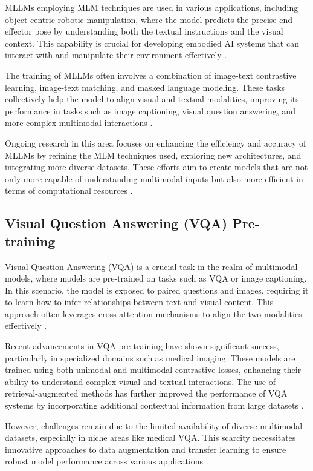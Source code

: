 MLLMs employing MLM techniques are used in various applications, including object-centric robotic manipulation, where the model predicts the precise end-effector pose by understanding both the textual instructions and the visual context. This capability is crucial for developing embodied AI systems that can interact with and manipulate their environment effectively \cite{ManipLLM2024}.

The training of MLLMs often involves a combination of image-text contrastive learning, image-text matching, and masked language modeling. These tasks collectively help the model to align visual and textual modalities, improving its performance in tasks such as image captioning, visual question answering, and more complex multimodal interactions \cite{OverviewLMM2024}.

Ongoing research in this area focuses on enhancing the efficiency and accuracy of MLLMs by refining the MLM techniques used, exploring new architectures, and integrating more diverse datasets. These efforts aim to create models that are not only more capable of understanding multimodal inputs but also more efficient in terms of computational resources \cite{ResearchDevelopment2023}.



\subsection{Visual Question Answering (VQA) Pre-training}

Visual Question Answering (VQA) is a crucial task in the realm of multimodal models, where models are pre-trained on tasks such as VQA or image captioning. In this scenario, the model is exposed to paired questions and images, requiring it to learn how to infer relationships between text and visual content. This approach often leverages cross-attention mechanisms to align the two modalities effectively \cite{MaskedVisionLanguage2023}.

Recent advancements in VQA pre-training have shown significant success, particularly in specialized domains such as medical imaging. These models are trained using both unimodal and multimodal contrastive losses, enhancing their ability to understand complex visual and textual interactions. The use of retrieval-augmented methods has further improved the performance of VQA systems by incorporating additional contextual information from large datasets \cite{RAMMBiomedicalVQA2023}.

However, challenges remain due to the limited availability of diverse multimodal datasets, especially in niche areas like medical VQA. This scarcity necessitates innovative approaches to data augmentation and transfer learning to ensure robust model performance across various applications \cite{MedicalVQA2023}.


